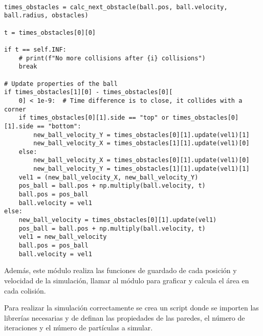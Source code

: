 \begin{lstlisting}[breaklines]

times_obstacles = calc_next_obstacle(ball.pos, ball.velocity, ball.radius, obstacles)

t = times_obstacles[0][0]

if t == self.INF:
    # print(f"No more collisions after {i} collisions")
    break

# Update properties of the ball
if times_obstacles[1][0] - times_obstacles[0][
    0] < 1e-9:  # Time difference is to close, it collides with a corner
    if times_obstacles[0][1].side == "top" or times_obstacles[0][1].side == "bottom":
        new_ball_velocity_Y = times_obstacles[0][1].update(vel1)[1]
        new_ball_velocity_X = times_obstacles[1][1].update(vel1)[0]
    else:
        new_ball_velocity_X = times_obstacles[0][1].update(vel1)[0]
        new_ball_velocity_Y = times_obstacles[1][1].update(vel1)[1]
    vel1 = (new_ball_velocity_X, new_ball_velocity_Y)
    pos_ball = ball.pos + np.multiply(ball.velocity, t)
    ball.pos = pos_ball
    ball.velocity = vel1
else:
    new_ball_velocity = times_obstacles[0][1].update(vel1)
    pos_ball = ball.pos + np.multiply(ball.velocity, t)
    vel1 = new_ball_velocity
    ball.pos = pos_ball
    ball.velocity = vel1
\end{lstlisting}

Además, este módulo realiza las funciones de guardado de cada posición y velocidad de la simulación, llamar al módulo para graficar y calcula el área en cada colisión.

\vspace{3mm}

Para realizar la simulación correctamente se crea un script donde se importen las librerías necesarias y de definan las propiedades de las paredes, el número de iteraciones y el número de partículas a simular.

